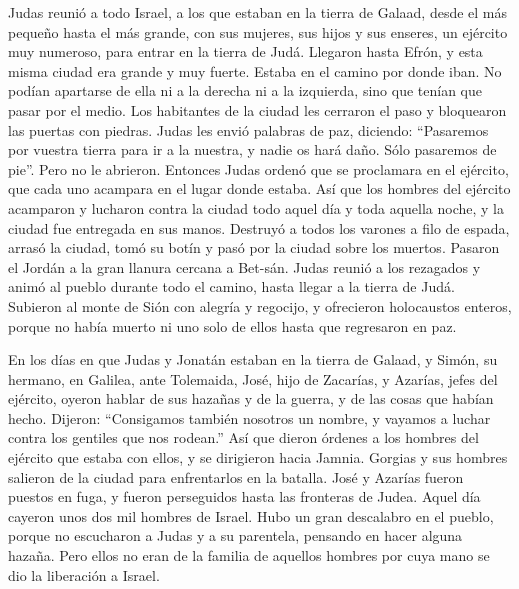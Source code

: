  Judas reunió a todo Israel, a los que estaban en la
tierra de Galaad, desde el más pequeño hasta el más grande, con sus
mujeres, sus hijos y sus enseres, un ejército muy numeroso, para entrar
en la tierra de Judá.  Llegaron hasta Efrón, y esta misma
ciudad era grande y muy fuerte. Estaba en el camino por donde iban. No
podían apartarse de ella ni a la derecha ni a la izquierda, sino que
tenían que pasar por el medio.  Los habitantes de la
ciudad les cerraron el paso y bloquearon las puertas con piedras.
 Judas les envió palabras de paz, diciendo: ``Pasaremos
por vuestra tierra para ir a la nuestra, y nadie os hará daño. Sólo
pasaremos de pie''. Pero no le abrieron.  Entonces Judas
ordenó que se proclamara en el ejército, que cada uno acampara en el
lugar donde estaba.  Así que los hombres del ejército
acamparon y lucharon contra la ciudad todo aquel día y toda aquella
noche, y la ciudad fue entregada en sus manos.  Destruyó
a todos los varones a filo de espada, arrasó la ciudad, tomó su botín y
pasó por la ciudad sobre los muertos.  Pasaron el Jordán
a la gran llanura cercana a Bet-sán.  Judas reunió a los
rezagados y animó al pueblo durante todo el camino, hasta llegar a la
tierra de Judá.  Subieron al monte de Sión con alegría y
regocijo, y ofrecieron holocaustos enteros, porque no había muerto ni
uno solo de ellos hasta que regresaron en paz.

 En los días en que Judas y Jonatán estaban en la tierra
de Galaad, y Simón, su hermano, en Galilea, ante Tolemaida,
 José, hijo de Zacarías, y Azarías, jefes del ejército,
oyeron hablar de sus hazañas y de la guerra, y de las cosas que habían
hecho.  Dijeron: ``Consigamos también nosotros un nombre,
y vayamos a luchar contra los gentiles que nos rodean.'' 
Así que dieron órdenes a los hombres del ejército que estaba con ellos,
y se dirigieron hacia Jamnia.  Gorgias y sus hombres
salieron de la ciudad para enfrentarlos en la batalla. 
José y Azarías fueron puestos en fuga, y fueron perseguidos hasta las
fronteras de Judea. Aquel día cayeron unos dos mil hombres de Israel.
 Hubo un gran descalabro en el pueblo, porque no
escucharon a Judas y a su parentela, pensando en hacer alguna hazaña.
 Pero ellos no eran de la familia de aquellos hombres por
cuya mano se dio la liberación a Israel.


